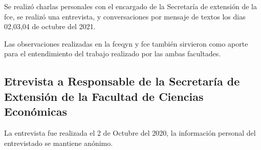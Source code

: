 Se realizó charlas personales con el encargado de la Secretaría de extensión de la \gls{fce}, se realizó una entrevista, 
y conversaciones por mensaje de textos los dias 02,03,04 de octubre del 2021.

Las observaciones realizadas en la \gls{fceqyn} y \gls{fce} también sirvieron como aporte para el entendimiento del trabajo realizado por las ambas facultades.  


\subsection{Etrevista a Responsable de la Secretaría de Extensión de la Facultad de Ciencias Económicas}
La entrevista fue realizada el 2 de Octubre del 2020, la información personal del entrevistado se mantiene anónimo. 


